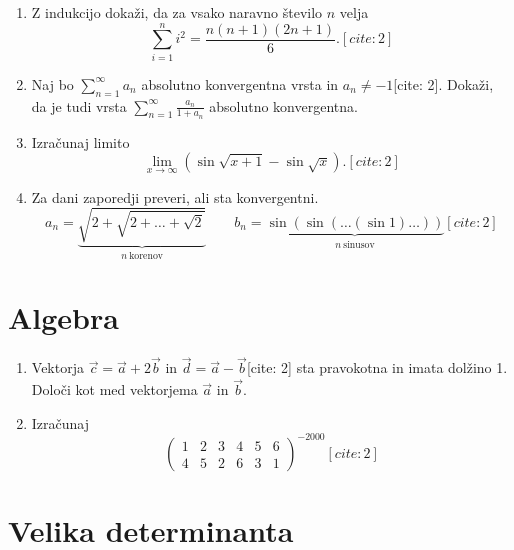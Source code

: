\documentclass[a4paper,12pt]{article}
\begin{document}
\begin{enumerate}
\item
Z indukcijo dokaži, da za vsako naravno število \(n\) velja
\[\sum_{i=1}^n i^2 = \frac{n(n+1)(2n+1)}{6}.[cite: 2]\]

\item
Naj bo \(\sum_{n=1}^\infty a_n\) absolutno konvergentna vrsta in \(a_n \ne -1\)[cite: 2].
Dokaži, da je tudi vrsta \(\sum_{n=1}^\infty \frac{a_n}{1+a_n}\)
absolutno konvergentna.

\item
Izračunaj limito
\[\lim_{x \to \infty} \left(\sin\sqrt{x+1} - \sin\sqrt{x}\right).[cite: 2]\]

\item
Za dani zaporedji preveri, ali sta konvergentni.
\[a_n = \underbrace{\sqrt{2+\sqrt{2+\dots+\sqrt{2}}}}_{n~\text{korenov}} \qquad b_n = \underbrace{\sin(\sin(\dots(\sin 1)\dots))}_{n~\text{sinusov}}[cite: 2]\]
\end{enumerate}

\section*{Algebra}

\begin{enumerate}
\item
Vektorja \(\vec{c} = \vec{a} + 2\vec{b}\) in \(\vec{d} = \vec{a} - \vec{b}\)[cite: 2]
sta pravokotna in imata dolžino 1. Določi kot med vektorjema \(\vec{a}\) in \(\vec{b}\).

\item
Izračunaj
\[\begin{pmatrix} 1 & 2 & 3 & 4 & 5 & 6 \\ 4 & 5 & 2 & 6 & 3 & 1 \end{pmatrix}^{-2000}[cite: 2]\]
\end{enumerate}

\section*{Velika determinanta}
\end{document}
